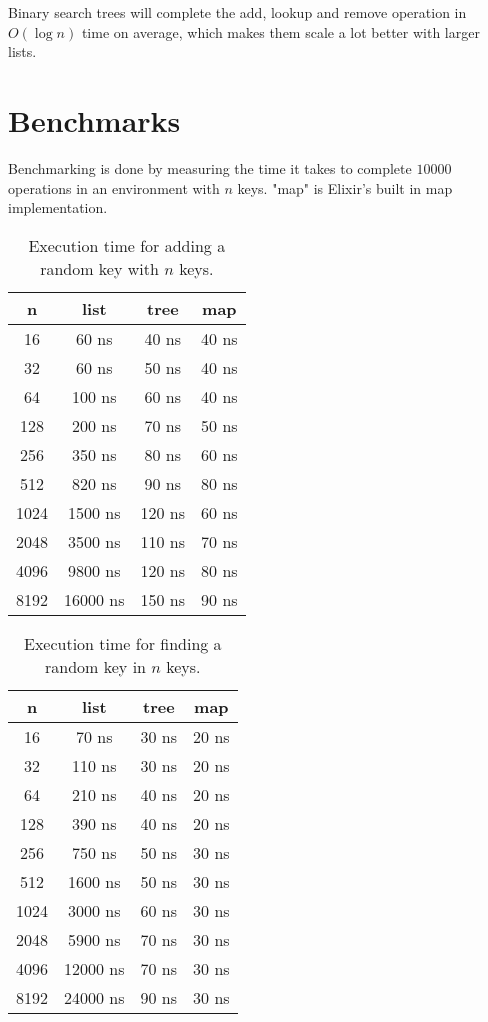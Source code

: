 \documentclass[a4paper,11pt]{article}
\begin{document}
Binary search trees will complete the add, lookup and remove operation in $O(\log n)$ time on average, which makes them scale a lot better with larger lists.

\section*{Benchmarks}

Benchmarking is done by measuring the time it takes to complete $10000$ operations in an environment with $n$ keys. "map" is Elixir's built in map implementation.

\begin{table}[H]
\centering
\begin{tabular}{|c|c|c|c|}
\hline
\textbf{n} & \textbf{list} & \textbf{tree} & \textbf{map} \\
\hline
	16 & 60 ns & 40 ns & 40 ns \\
	32 & 60 ns & 50 ns & 40 ns \\
	64 & 100 ns & 60 ns & 40 ns \\
	128 & 200 ns & 70 ns & 50 ns \\
	256 & 350 ns & 80 ns & 60 ns \\
	512 & 820 ns & 90 ns & 80 ns \\
	1024 & 1500 ns & 120 ns & 60 ns \\
	2048 & 3500 ns & 110 ns & 70 ns \\
	4096 & 9800 ns & 120 ns & 80 ns \\
	8192 & 16000 ns & 150 ns & 90 ns \\
\hline
\end{tabular}
\caption{Execution time for adding a random key with $n$ keys.}
\label{tab:table1}
\end{table}

\begin{table}[H]
\centering
\begin{tabular}{|c|c|c|c|}
\hline
\textbf{n} & \textbf{list} & \textbf{tree} & \textbf{map} \\
\hline
  16 & 70 ns & 30 ns & 20 ns \\
  32 & 110 ns & 30 ns & 20 ns \\
  64 & 210 ns & 40 ns & 20 ns \\
  128 & 390 ns & 40 ns & 20 ns \\
  256 & 750 ns & 50 ns & 30 ns \\
  512 & 1600 ns & 50 ns & 30 ns \\
  1024 & 3000 ns & 60 ns & 30 ns \\
  2048 & 5900 ns & 70 ns & 30 ns \\
  4096 & 12000 ns & 70 ns & 30 ns \\
  8192 & 24000 ns & 90 ns & 30 ns \\
\hline
\end{tabular}
\caption{Execution time for finding a random key in $n$ keys.}
\label{tab:table2}
\end{table}
\end{document}
